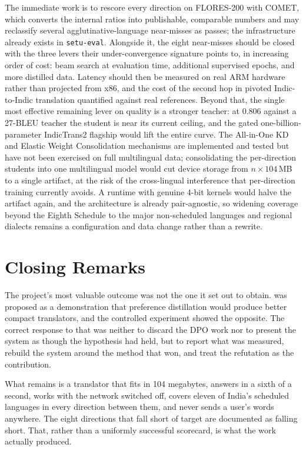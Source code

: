 The immediate work is to rescore every direction on FLORES-200 with COMET,
which converts the internal ratios into publishable, comparable numbers and may
reclassify several agglutinative-language near-misses as passes; the
infrastructure already exists in \texttt{setu-eval}. Alongside it, the eight
near-misses should be closed with the three levers their under-convergence
signature points to, in increasing order of cost: beam search at evaluation
time, additional supervised epochs, and more distilled data. Latency should
then be measured on real ARM hardware rather than projected from x86, and the
cost of the second hop in pivoted Indic-to-Indic translation quantified against
real references. Beyond that, the single most effective remaining lever on
quality is a stronger teacher: at 0.806 against a 27-BLEU teacher the student
is near its current ceiling, and the gated one-billion-parameter IndicTrans2
flagship would lift the entire curve. The All-in-One KD and Elastic Weight
Consolidation mechanisms are implemented and tested but have not been exercised
on full multilingual data; consolidating the per-direction students into one
multilingual model would cut device storage from $n \times 104$\,MB to a single
artifact, at the risk of the cross-lingual interference that per-direction
training currently avoids. A runtime with genuine 4-bit kernels would halve the
artifact again, and the architecture is already pair-agnostic, so widening
coverage beyond the Eighth Schedule to the major non-scheduled languages and
regional dialects remains a configuration and data change rather than a
rewrite.

\section{Closing Remarks}
\label{sec:closing}

The project's most valuable outcome was not the one it set out to obtain. \setu{}
was proposed as a demonstration that preference distillation would produce better
compact translators, and the controlled experiment showed the opposite. The
correct response to that was neither to discard the DPO work nor to present the
system as though the hypothesis had held, but to report what was measured,
rebuild the system around the method that won, and treat the refutation as the
contribution.

What remains is a translator that fits in 104 megabytes, answers in a sixth of a
second, works with the network switched off, covers eleven of India's scheduled
languages in every direction between them, and never sends a user's words
anywhere. The eight directions that fall short of target are documented as
falling short. That, rather than a uniformly successful scorecard, is what the
work actually produced.
